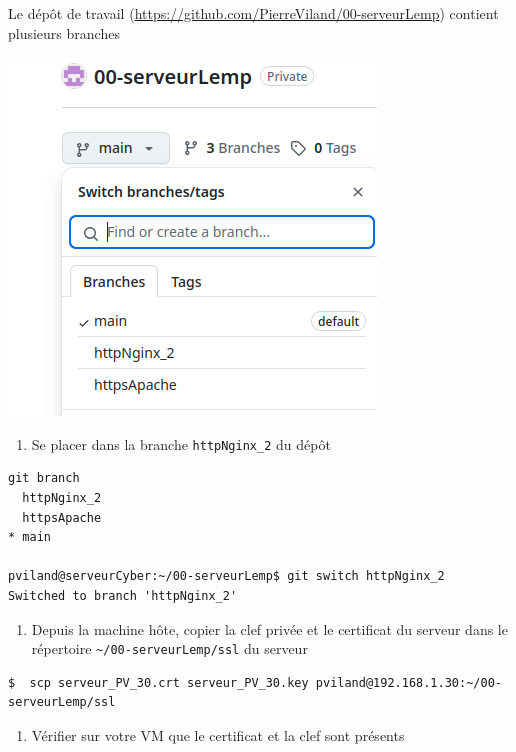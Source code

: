 \documentclass[french, 12pt]{article}%
\begin{document}
Le dépôt de travail (\url{https://github.com/PierreViland/00-serveurLemp}) contient plusieurs branches 
\begin{center}
\includegraphics[scale=0.5]{./ressource/branchServeurLemp}
\end{center}

\begin{enumerate}[resume]
\item Se placer dans la branche \verb?httpNginx_2? du dépôt
\end{enumerate}

\begin{lstlisting}[style=commande]
git branch
  httpNginx_2
  httpsApache
* main

pviland@serveurCyber:~/00-serveurLemp$ git switch httpNginx_2 
Switched to branch 'httpNginx_2'
\end{lstlisting}

\vspace{0.5cm}

\begin{enumerate}[resume]
\item Depuis la machine hôte, copier la clef privée et le certificat du serveur dans le répertoire \verb?~/00-serveurLemp/ssl? du serveur
\end{enumerate}


\begin{lstlisting}[style=commande]
$  scp serveur_PV_30.crt serveur_PV_30.key pviland@192.168.1.30:~/00-serveurLemp/ssl
\end{lstlisting}

\begin{enumerate}[resume]
\item Vérifier sur votre VM que le certificat et la clef sont présents
\end{enumerate}
\end{document}
